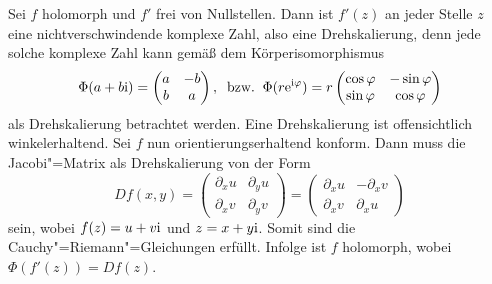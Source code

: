 \noindent
{} Sei $f$ holomorph und $f'$ frei von Nullstellen.
Dann ist $f'(z)$ an jeder Stelle $z$ eine nichtverschwindende
komplexe Zahl, also eine Drehskalierung, denn jede solche komplexe Zahl
kann gemäß dem Körperisomorphismus%
\begin{equation}
\Phi(a+b\mathrm i) = \begin{pmatrix}a & -b\\ b & a\end{pmatrix},\;\;
\text{bzw.}\;\;\Phi(r\mathrm e^{\mathrm i\varphi})
= r\begin{pmatrix}\cos\varphi & -\sin\varphi\\
\sin\varphi & \cos\varphi\end{pmatrix}
\end{equation}
als Drehskalierung betrachtet werden. Eine Drehskalierung ist
offensichtlich winkelerhaltend.
Sei $f$ nun orientierungserhaltend konform. Dann muss die
Jacobi"=Matrix als Drehskalierung von der Form%
\begin{equation}
Df(x,y) = \begin{pmatrix}
\partial_x u & \partial_y u\\
\partial_x v & \partial_y v
\end{pmatrix}
= \begin{pmatrix}
\partial_x u & -\partial_x v\\
\partial_x v & \partial_x u
\end{pmatrix}
\end{equation}
sein, wobei $f(z)=u+v\mathrm i$ und $z=x+y\mathrm i$. Somit sind die
Cauchy"=Riemann"=Gleichungen erfüllt. Infolge ist $f$ holomorph,
wobei $\Phi(f'(z))=Df(z)$.\;\qedsymbol

